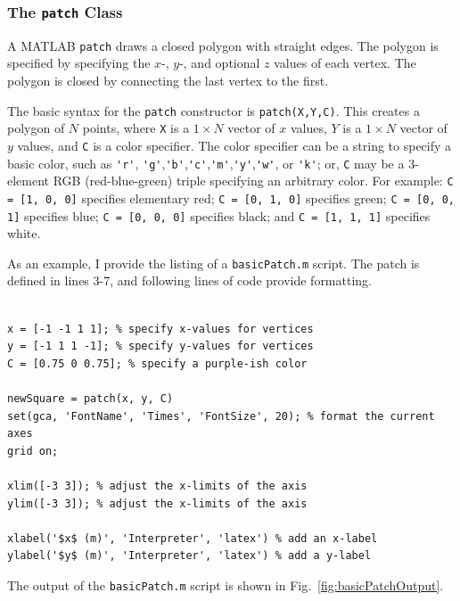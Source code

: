 \subsubsection{The \texttt{patch} Class}
A MATLAB \texttt{patch} draws a closed polygon with straight edges. The polygon is specified by specifying the $x$-, $y$-, and optional $z$ values of each vertex. The polygon is closed by connecting the last vertex to the first.

The basic syntax for the \texttt{patch} constructor is \texttt{patch(X,Y,C)}. This creates a polygon of $N$ points, where \texttt{X} is a $1\times N$ vector of $x$ values, $Y$ is a $1\times N$ vector of $y$ values, and \texttt{C} is a color specifier. The color specifier can be a string to specify a basic color, such as \verb!'r'!, \verb!'g'!,\verb!'b'!,\verb!'c'!,\verb!'m'!,\verb!'y'!,\verb!'w'!, or \verb!'k'!; or, \texttt{C} may be a $3$-element RGB (red-blue-green) triple specifying an arbitrary color. For example: \verb!C = [1, 0, 0]! specifies elementary red; \verb!C = [0, 1, 0]! specifies green; \verb!C = [0, 0, 1]! specifies blue; \verb!C = [0, 0, 0]! specifies black; and \verb!C = [1, 1, 1]! specifies white.

As an example, I provide the listing of a \texttt{basicPatch.m} script. The patch is defined in lines 3-7, and following lines of code provide formatting.
\begin{lstlisting}[style=Matlab-editor,label=basicPatch,caption={Listing of the script \texttt{basicPatch.m}.}]
% basicPatch.m

x = [-1 -1 1 1]; % specify x-values for vertices
y = [-1 1 1 -1]; % specify y-values for vertices
C = [0.75 0 0.75]; % specify a purple-ish color

newSquare = patch(x, y, C)
set(gca, 'FontName', 'Times', 'FontSize', 20); % format the current axes
grid on;

xlim([-3 3]); % adjust the x-limits of the axis
ylim([-3 3]); % adjust the x-limits of the axis

xlabel('$x$ (m)', 'Interpreter', 'latex') % add an x-label
ylabel('$y$ (m)', 'Interpreter', 'latex') % add a y-label
\end{lstlisting}
The output of the \texttt{basicPatch.m} script is shown in Fig.\ \ref{fig:basicPatchOutput}.

